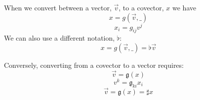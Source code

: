 \documentclass{report}
\begin{document}

When we convert between a vector, $\vec{v}$, to a covector, $x$ we have
$$ x = g(\vec{v}, \_) $$ 
$$ x_i = g_{ij} v^j  $$ 
We can also use a different notation, $\flat$:
$$ x = g(\vec{v}, \_)  = \flat \vec{v}$$ 

Conversely, converting from a covector to a vector requires:
$$ \vec{v} = \mathfrak{g}\left(x \right) $$ 
$$ v^k = \mathfrak{g}_{ki} x_i $$ 
$$ \vec{v} = \mathfrak{g}\left(x \right) = \sharp x $$ 
\end{document}
